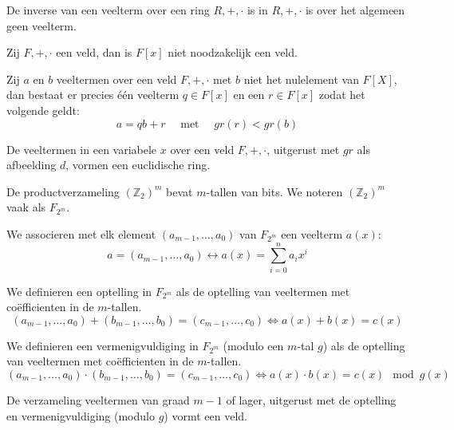 \documentclass[main.tex]{subfiles}
\begin{document}
\begin{opm}
  De inverse van een veelterm over een ring $R,+,\cdot$ is in $R,+,\cdot$ is over het algemeen geen veelterm.
\end{opm}

\begin{opm}
  Zij $F,+,\cdot$ een veld, dan is $F[x]$ niet noodzakelijk een veld.
\end{opm}

\begin{st}
  \label{st:deling-veelterm-over-veld}
  Zij $a$ en $b$ veeltermen over een veld $F,+,\cdot$ met $b$ niet het nulelement van $F[X]$, dan bestaat er precies \'e\'en veelterm $q \in F[x]$ en een $r \in F[x]$ zodat het volgende geldt:
  \[ a = qb + r \quad\text{ met }\quad gr(r) < gr(b) \]
\end{st}

\begin{st}
  De veeltermen in een variabele $x$ over een veld $F,+,\cdot$, uitgerust met $gr$ als afbeelding $d$, vormen een euclidische ring.
\end{st}

\begin{de}
  De productverzameling $(\mathbb{Z}_{2})^{m}$ bevat $m$-tallen van bits.
  We noteren $(\mathbb{Z}_{2})^{m}$ vaak als $F_{2^{m}}$.
\end{de}

\begin{de}
  We associeren met elk element $(a_{m-1},\dotsc,a_{0})$ van $F_{2^{m}}$ een veelterm $a(x)$:
  \[ a = (a_{m-1},\dotsc,a_{0}) \longleftrightarrow a(x) = \sum_{i=0}^{n}a_{i}x^{i} \]
\end{de}

\begin{de}
  We definieren een optelling in $F_{2^{m}}$ als de optelling van veeltermen met co\"efficienten in de $m$-tallen.
  \[ (a_{m-1},\dotsc,a_{0}) + (b_{m-1},\dotsc,b_{0}) =  (c_{m-1},\dotsc,c_{0}) \Leftrightarrow a(x) + b(x) = c(x) \]
\end{de}

\begin{de}
  We definieren een vermenigvuldiging in $F_{2^{m}}$ (modulo een $m$-tal $g$) als de optelling van veeltermen met co\"efficienten in de $m$-tallen.
  \[ (a_{m-1},\dotsc,a_{0}) \cdot (b_{m-1},\dotsc,b_{0}) =  (c_{m-1},\dotsc,c_{0}) \Leftrightarrow a(x) \cdot b(x) = c(x) \mod g(x) \]
\end{de}

\begin{ei}
  De verzameling veeltermen van graad $m-1$ of lager, uitgerust met de optelling en vermenigvuldiging (modulo $g$) vormt een veld.
\end{ei}
\end{document}
